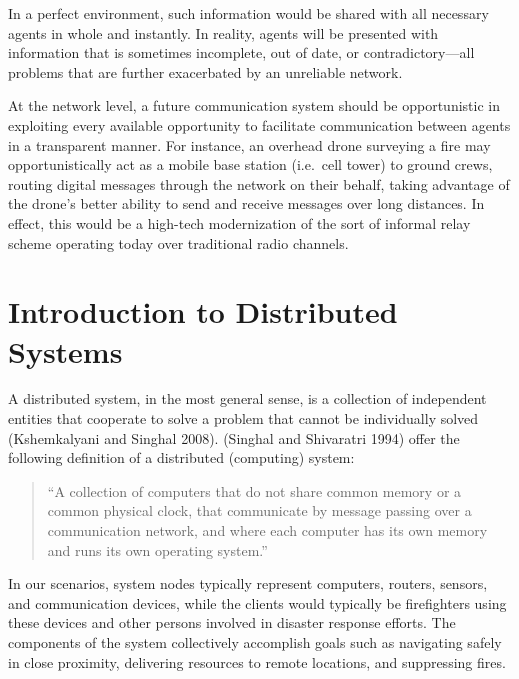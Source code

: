 \documentclass[]             %
{NASA}                       %
\theoremstyle{definition}
\begin{document}
In a perfect environment, such information would be shared with all
necessary agents in whole and instantly. In reality, agents will be
presented with information that is sometimes incomplete, out of date, or
contradictory---all problems that are further exacerbated by an
unreliable network.

At the network level, a future communication system should be
opportunistic in exploiting every available opportunity to facilitate
communication between agents in a transparent manner. For instance, an
overhead drone surveying a fire may opportunistically act as a mobile
base station (i.e.~cell tower) to ground crews, routing digital messages
through the network on their behalf, taking advantage of the drone's
better ability to send and receive messages over long distances. In
effect, this would be a high-tech modernization of the sort of informal
relay scheme operating today over traditional radio channels.

\newpage

\hypertarget{introduction-to-distributed-systems}{%
\section{Introduction to Distributed
Systems}\label{introduction-to-distributed-systems}}

\label{sec:background}

A distributed system, in the most general sense, is a collection of
independent entities that cooperate to solve a problem that cannot be
individually solved (Kshemkalyani and Singhal 2008). (Singhal and
Shivaratri 1994) offer the following definition of a distributed
(computing) system:

\begin{quote}
``A collection of computers that do not share common memory or a common
physical clock, that communicate by message passing over a communication
network, and where each computer has its own memory and runs its own
operating system.''
\end{quote}

In our scenarios, system nodes typically represent computers, routers,
sensors, and communication devices, while the clients would typically be
firefighters using these devices and other persons involved in disaster
response efforts. The components of the system collectively accomplish
goals such as navigating safely in close proximity, delivering resources
to remote locations, and suppressing fires.
\end{document}
